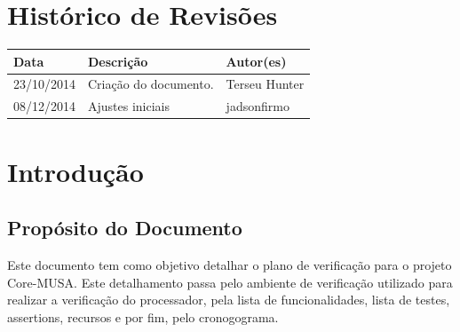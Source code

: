 \documentclass{article}
\begin{document}
\capa

  \section*{\center Histórico de Revisões}
  \vspace*{1cm}
  \begin{center} %
    \begin{longtable}[pos]{|m{2cm} | m{7.2cm} | m{3.8cm}|} 
      \hline %
      \cellcolor[gray]{0.9}
      \textbf{Data} & \cellcolor[gray]{0.9}\textbf{Descrição} & \cellcolor[gray]{0.9}\textbf{Autor(es)}\\ \hline
      \hline
      \small 23/10/2014 & \small Criação do documento. & \small Terseu Hunter \\ \hline
      \hline
      \small 08/12/2014 & \small Ajustes iniciais & \small jadsonfirmo \\ \hline 
    \end{longtable}
  \end{center}

  \newpage
  \tableofcontents
  \newpage

  \section{Introdução}

	\subsection{Propósito do Documento}
	Este documento tem como objetivo detalhar o plano de verificação para o projeto Core-MUSA. Este detalhamento passa pelo ambiente de verificação utilizado para realizar a verificação do processador, pela lista de funcionalidades, lista de testes, assertions, recursos e por fim, pelo cronogograma.
	
\end{document}
